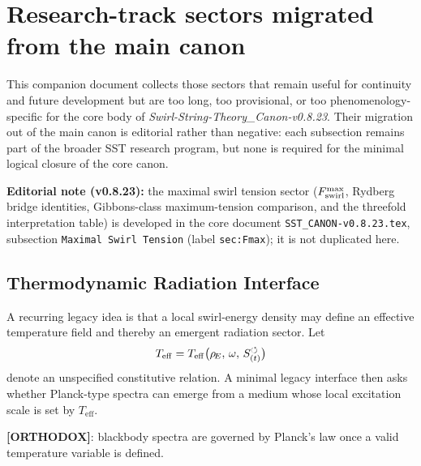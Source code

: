 \makeatletter
{}
\makeatother


\section{Research-track sectors migrated from the main canon}

\noindent
This companion document collects those sectors that remain useful for continuity and future development but are too long, too provisional, or too phenomenology-specific for the core body of \textit{Swirl-String-Theory\_Canon-v0.8.23}. Their migration out of the main canon is editorial rather than negative: each subsection remains part of the broader SST research program, but none is required for the minimal logical closure of the core canon.

\medskip
\noindent
\textbf{Editorial note (v0.8.23):} the maximal swirl tension sector ($F_{\rm swirl}^{\max}$, Rydberg bridge identities, Gibbons-class maximum-tension comparison, and the threefold interpretation table) is developed in the core document \texttt{SST\_CANON-v0.8.23.tex}, subsection \texttt{Maximal Swirl Tension} (label \texttt{sec:Fmax}); it is not duplicated here.

\medskip








\subsection{Thermodynamic Radiation Interface}
A recurring legacy idea is that a local swirl-energy density may define an effective temperature field and thereby an emergent radiation sector. Let
\begin{align}
    T_{\mathrm{eff}} = T_{\mathrm{eff}}\big(\rho_{\!E},\, \omega,\, S_{(t)}^{\boldsymbol{\circlearrowleft}}\big)
\end{align}
denote an unspecified constitutive relation. A minimal legacy interface then asks whether Planck-type spectra can emerge from a medium whose local excitation scale is set by $T_{\mathrm{eff}}$.

\textbf{[ORTHODOX]}: blackbody spectra are governed by Planck's law once a valid temperature variable is defined.

